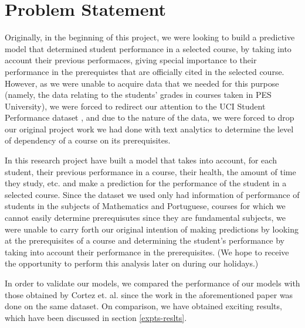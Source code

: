 \documentclass[conference]{IEEEtran}
\begin{document}
	\section{Problem Statement}
Originally, in the beginning of this project, we were looking to build a predictive model that determined student performance in a selected course, by taking into account their previous performaces, giving special importance to their performance in the prerequistes that are officially cited in the selected course. However, as we were unable to acquire data that we needed for this purpose (namely, the data relating to the students' grades in courses taken in PES University), we were forced to redirect our attention to the UCI Student Performance dataset \cite{Lichman:2013}\cite{ref:4}, and due to the nature of the data, we were forced to drop our original project work we had done with text analytics to determine the level of dependency of a course on its prerequisites.

In this research project have built a model that takes into account, for each student, their previous performance in a course, their health, the amount of time they study, etc. and make a prediction for the performance of the student in a selected course. Since the dataset we used only had information of performance of students in the subjects of Mathematics and Portuguese, courses for which we cannot easily determine prerequisutes since they are fundamental subjects, we were unable to carry forth our original intention of making predictions by looking at the prerequisites of a course and determining the student's performance by taking into account their performance in the prerequisites. (We hope to receive the opportunity to perform this analysis later on during our holidays.)

In order to validate our models, we compared the performance of our models with those obtained by Cortez et. al. \cite{ref:4} since the work in the aforementioned paper was done on the same dataset. On comparison, we have obtained exciting results, which have been discussed in section \ref{expts-reslts}.
\end{document}
